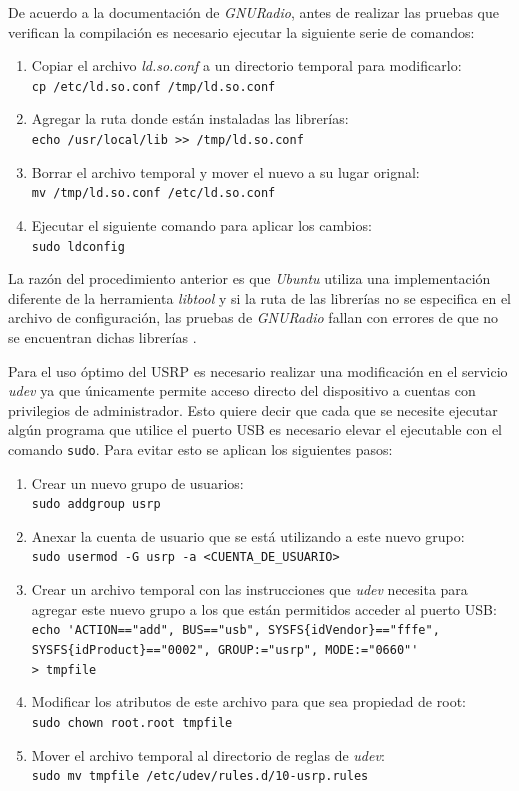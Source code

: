 De acuerdo a la documentaci\'on de \emph{GNURadio}, antes de realizar las
pruebas que verifican la compilaci\'on es necesario ejecutar la siguiente serie
de comandos:

\begin{enumerate}
  \item Copiar el archivo \emph{ld.so.conf} a un directorio temporal para
  modificarlo:\\
  \verb|cp /etc/ld.so.conf /tmp/ld.so.conf|
  \item Agregar la ruta donde est\'an instaladas las librer\'ias:\\
  \verb|echo /usr/local/lib >> /tmp/ld.so.conf|
  \item Borrar el archivo temporal y mover el nuevo a su lugar orignal:\\
  \verb|mv /tmp/ld.so.conf /etc/ld.so.conf|
  \item Ejecutar el siguiente comando para aplicar los cambios:\\
  \verb|sudo ldconfig|
\end{enumerate}

La raz\'on del procedimiento anterior es que \emph{Ubuntu} utiliza una
implementaci\'on diferente de la herramienta \emph{libtool} y si la ruta de las
librer\'ias no se especifica en el archivo de configuraci\'on, las pruebas
de \emph{GNURadio} fallan con errores de que no se encuentran dichas
librer\'ias \cite{radio}.


Para el uso \'optimo del USRP es necesario realizar una modificaci\'on en el
servicio \emph{udev} ya que \'unicamente permite acceso directo del dispositivo
a cuentas con privilegios de administrador. Esto quiere decir que cada que
se necesite ejecutar alg\'un programa que utilice el puerto USB es necesario
elevar el ejecutable con el comando \verb|sudo|. Para evitar esto se aplican los siguientes pasos:

\begin{enumerate}
  \item Crear un nuevo grupo de usuarios:\\
  \verb|sudo addgroup usrp|
  \item Anexar la cuenta de usuario que se est\'a utilizando a este nuevo
  grupo:\\
  \verb|sudo usermod -G usrp -a <CUENTA_DE_USUARIO>|
  \item Crear un archivo temporal con las instrucciones que \emph{udev} necesita
  para agregar este nuevo grupo a los que est\'an permitidos acceder al puerto
  USB:\\
  \verb|echo 'ACTION=="add", BUS=="usb", SYSFS{idVendor}=="fffe",|\\
  \verb|SYSFS{idProduct}=="0002", GROUP:="usrp", MODE:="0660"'|\\
  \verb|> tmpfile|
  \item Modificar los atributos de este archivo para que sea propiedad de root:\\
  \verb|sudo chown root.root tmpfile|
  \item Mover el archivo temporal al directorio de reglas de \emph{udev}:\\
  \verb|sudo mv tmpfile /etc/udev/rules.d/10-usrp.rules|
\end{enumerate}

